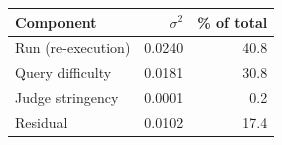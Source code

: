 \begin{tabular}{lrr}
\toprule
Component & $\sigma^2$ & \% of total\\
\midrule
Run (re-execution) & 0.0240 & 40.8\\
Query difficulty & 0.0181 & 30.8\\
Judge stringency & 0.0001 & 0.2\\
Residual & 0.0102 & 17.4\\
\bottomrule
\end{tabular}
